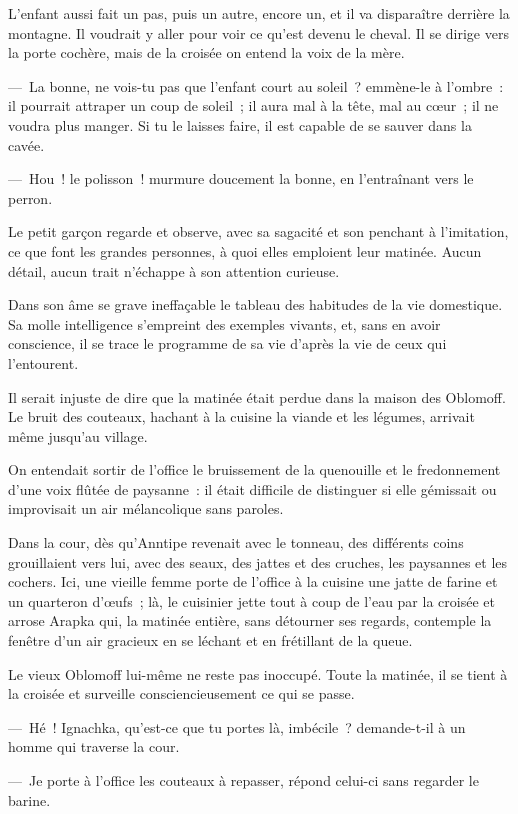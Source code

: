 \documentclass[french,twoside]{book} %
\begin{document}
L’enfant aussi fait un pas, puis un autre, encore un, et il va disparaître derrière la montagne. Il voudrait y aller pour voir ce qu’est devenu le cheval. Il se dirige vers la porte cochère, mais de la croisée on entend la voix de la mère.\par
— La bonne, ne vois-tu pas que l’enfant court au soleil ? emmène-le à l’ombre : il pourrait attraper un coup de soleil ; il aura mal à la tête, mal au cœur ; il ne voudra plus manger. Si tu le laisses faire, il est capable de se sauver dans la cavée.\par
— Hou ! le polisson ! murmure doucement la bonne, en l’entraînant vers le perron.\par
Le petit garçon regarde et observe, avec sa sagacité et son penchant à l’imitation, ce que font les grandes personnes, à quoi elles emploient leur matinée. Aucun détail, aucun trait n’échappe à son attention curieuse.\par
Dans son âme se grave ineffaçable le tableau des habitudes de la vie domestique. Sa molle intelligence s’empreint des exemples vivants, et, sans en avoir conscience, il se trace le programme de sa vie d’après la vie de ceux qui l’entourent.\par
Il serait injuste de dire que la matinée était perdue dans la maison des Oblomoff. Le bruit des couteaux, hachant à la cuisine la viande et les légumes, arrivait même jusqu’au village.\par
On entendait sortir de l’office le bruissement de la quenouille et le fredonnement d’une voix flûtée de paysanne : il était difficile de distinguer si elle gémissait ou improvisait un air mélancolique sans paroles.\par
Dans la cour, dès qu’Anntipe revenait avec le tonneau, des différents coins grouillaient vers lui, avec des seaux, des jattes et des cruches, les paysannes et les cochers. Ici, une vieille femme porte de l’office à la cuisine une jatte de farine et un quarteron d’œufs ; là, le cuisinier jette tout à coup de l’eau par la croisée et arrose Arapka qui, la matinée entière, sans détourner ses regards, contemple la fenêtre d’un air gracieux en se léchant et en frétillant de la queue.\par
Le vieux Oblomoff lui-même ne reste pas inoccupé. Toute la matinée, il se tient à la croisée et surveille consciencieusement ce qui se passe.\par
— Hé ! Ignachka, qu’est-ce que tu portes là, imbécile ? demande-t-il à un homme qui traverse la cour.\par
— Je porte à l’office les couteaux à repasser, répond celui-ci sans regarder le barine.\par
\end{document}
